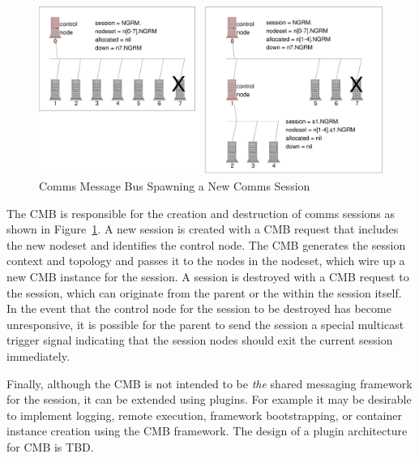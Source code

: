 \begin{figure}
\centering
\includegraphics[scale=0.50]{../fig/cmb.eps}
\caption{Comms Message Bus Spawning a New Comms Session}
\label{FigCMBSpawn}
\end{figure}

The CMB is responsible for the creation and destruction of
comms sessions as shown in Figure~\ref{FigCMBSpawn}.
A new session is created with a CMB request that
includes the new nodeset and identifies the control node.  The CMB
generates the session context and topology and passes it to the nodes
in the nodeset, which wire up a new CMB instance for the session.
A session is destroyed with a CMB request to the session,
which can originate from the parent or the within the session itself.
In the event that the control node for the session to be destroyed has become
unresponsive, it is possible for the parent to send the session a
special multicast trigger signal indicating that the session nodes
should exit the current session immediately.

Finally, although the CMB is not intended to be {\em the} shared messaging
framework for the session, it can be extended using plugins.
For example it may be desirable to implement logging, remote execution,
framework bootstrapping, or container instance creation using the
CMB framework.  The design of a plugin architecture for CMB is TBD.
